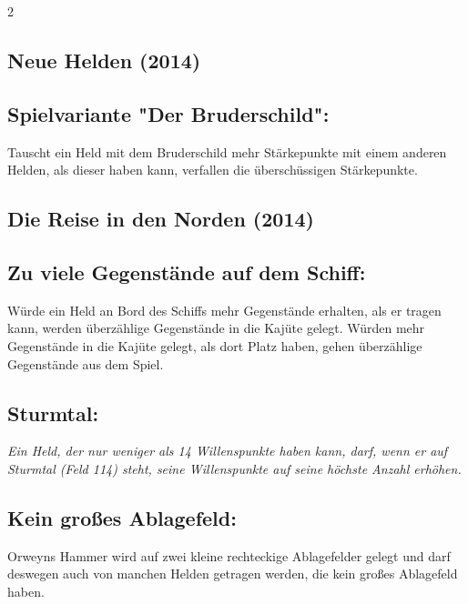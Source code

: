 \documentclass[10pt, a4paper, oneside]{book}
\newcommand{\fan}[1]{\textit{#1}}
\begin{document}
\begin{multicols*}{2}
\begin{nobgcolor}
\section{Neue Helden (2014)}

\subsection{Spielvariante "Der Bruderschild":}

Tauscht ein Held mit dem Bruderschild mehr Stärkepunkte mit einem anderen Helden, als dieser haben kann, verfallen die überschüssigen Stärkepunkte.
\supercite{nh-begleitheft}

\end{nobgcolor}


\begin{bgcolor}
\section{Die Reise in den Norden (2014)}

\subsection{Zu viele Gegenstände auf dem Schiff:}

Würde ein Held an Bord des Schiffs mehr Gegenstände erhalten, als er tragen kann, werden überzählige Gegenstände in die Kajüte gelegt. Würden mehr Gegenstände in die Kajüte gelegt, als dort Platz haben, gehen überzählige Gegenstände aus dem Spiel.
\supercite{11056}


\subsection{Sturmtal:}

\fan{Ein Held, der nur weniger als 14 Willenspunkte haben kann, darf, wenn er auf Sturmtal (Feld 114) steht, seine Willenspunkte auf seine höchste Anzahl erhöhen.}





\subsection{Kein großes Ablagefeld:}

Orweyns Hammer wird auf zwei kleine rechteckige Ablagefelder gelegt und darf deswegen auch von manchen Helden getragen werden, die kein großes Ablagefeld haben.
\supercite{dridn-begleitheft}


\end{bgcolor}
\end{multicols*}
\end{document}
